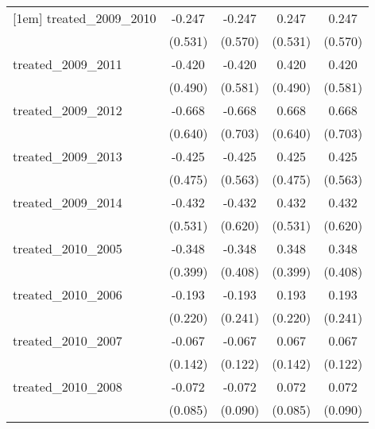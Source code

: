 {\begin{tabular}{l*{4}{c}}
[1em]
treated\_2009\_2010&      -0.247         &      -0.247         &       0.247         &       0.247         \\
            &     (0.531)         &     (0.570)         &     (0.531)         &     (0.570)         \\
[1em]
treated\_2009\_2011&      -0.420         &      -0.420         &       0.420         &       0.420         \\
            &     (0.490)         &     (0.581)         &     (0.490)         &     (0.581)         \\
[1em]
treated\_2009\_2012&      -0.668         &      -0.668         &       0.668         &       0.668         \\
            &     (0.640)         &     (0.703)         &     (0.640)         &     (0.703)         \\
[1em]
treated\_2009\_2013&      -0.425         &      -0.425         &       0.425         &       0.425         \\
            &     (0.475)         &     (0.563)         &     (0.475)         &     (0.563)         \\
[1em]
treated\_2009\_2014&      -0.432         &      -0.432         &       0.432         &       0.432         \\
            &     (0.531)         &     (0.620)         &     (0.531)         &     (0.620)         \\
[1em]
treated\_2010\_2005&      -0.348         &      -0.348         &       0.348         &       0.348         \\
            &     (0.399)         &     (0.408)         &     (0.399)         &     (0.408)         \\
[1em]
treated\_2010\_2006&      -0.193         &      -0.193         &       0.193         &       0.193         \\
            &     (0.220)         &     (0.241)         &     (0.220)         &     (0.241)         \\
[1em]
treated\_2010\_2007&      -0.067         &      -0.067         &       0.067         &       0.067         \\
            &     (0.142)         &     (0.122)         &     (0.142)         &     (0.122)         \\
[1em]
treated\_2010\_2008&      -0.072         &      -0.072         &       0.072         &       0.072         \\
            &     (0.085)         &     (0.090)         &     (0.085)         &     (0.090)         \\

\end{tabular}}
